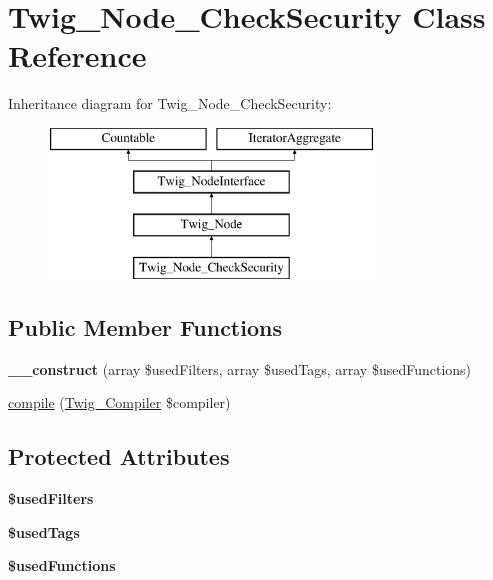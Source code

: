\hypertarget{class_twig___node___check_security}{}\section{Twig\+\_\+\+Node\+\_\+\+Check\+Security Class Reference}
\label{class_twig___node___check_security}
Inheritance diagram for Twig\+\_\+\+Node\+\_\+\+Check\+Security\+:\begin{figure}[H]
\begin{center}
\leavevmode
\includegraphics[height=4.000000cm]{class_twig___node___check_security}
\end{center}
\end{figure}
\subsection*{Public Member Functions}
\begin{DoxyCompactItemize}
\item 
\hypertarget{class_twig___node___check_security_ad11370c842a86bba892093faf07df875}{}{\bfseries \+\_\+\+\_\+construct} (array \$used\+Filters, array \$used\+Tags, array \$used\+Functions)\label{class_twig___node___check_security_ad11370c842a86bba892093faf07df875}

\item 
\hyperlink{class_twig___node___check_security_a4e0faa87c3fae583620b84d3607085da}{compile} (\hyperlink{class_twig___compiler}{Twig\+\_\+\+Compiler} \$compiler)
\end{DoxyCompactItemize}
\subsection*{Protected Attributes}
\begin{DoxyCompactItemize}
\item 
\hypertarget{class_twig___node___check_security_af9391002e3a74e97829228fb39c0f96c}{}{\bfseries \$used\+Filters}\label{class_twig___node___check_security_af9391002e3a74e97829228fb39c0f96c}

\item 
\hypertarget{class_twig___node___check_security_acfbba4351fbef8b69fbd3fde60d997ad}{}{\bfseries \$used\+Tags}\label{class_twig___node___check_security_acfbba4351fbef8b69fbd3fde60d997ad}

\item 
\hypertarget{class_twig___node___check_security_a840097a1863a38a4de51e2b82ef6b32f}{}{\bfseries \$used\+Functions}\label{class_twig___node___check_security_a840097a1863a38a4de51e2b82ef6b32f}

\end{DoxyCompactItemize}


